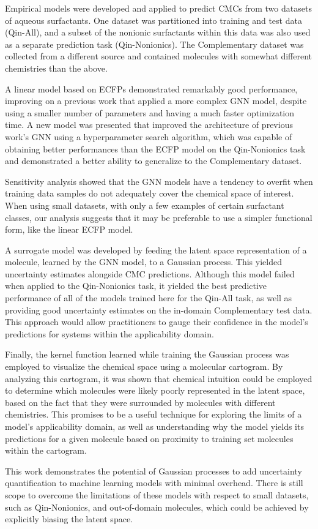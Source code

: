 Empirical models were developed and applied to predict CMCs from two datasets of
aqueous surfactants. One dataset was partitioned into training and test data
(Qin-All), and a subset of the nonionic surfactants within this data was also
used as a separate prediction task (Qin-Nonionics). The Complementary dataset was
collected from a different source and contained molecules with somewhat
different chemistries than the above.

A linear model based on ECFPs demonstrated remarkably good performance,
improving on a previous work \cite{qinPredictingCriticalMicelle2021} that
applied a more complex GNN model, despite using a smaller number of parameters
and having a much faster optimization time. A new model was presented that
improved the architecture of previous work's GNN using a hyperparameter search
algorithm, which was capable of obtaining better performances than the ECFP
model on the Qin-Nonionics task and demonstrated a better ability to generalize
to the Complementary dataset.

Sensitivity analysis showed that the GNN models have a tendency to overfit when
training data samples do not adequately cover the chemical space of interest.
When using small datasets, with only a few examples of certain surfactant
classes, our analysis suggests that it may be preferable to use a simpler
functional form, like the linear ECFP model.

A surrogate model was developed by feeding the latent space representation of a
molecule, learned by the GNN model, to a Gaussian process. This yielded
uncertainty estimates alongside CMC predictions. Although this model failed when
applied to the Qin-Nonionics task, it yielded the best predictive performance of
all of the models trained here for the Qin-All task, as well as providing good
uncertainty estimates on the in-domain Complementary test data. This approach would allow
practitioners to gauge their confidence in the model's predictions for systems
within the applicability domain.

Finally, the kernel function learned while training the Gaussian process was
employed to visualize the chemical space using a molecular cartogram. By
analyzing this cartogram, it was shown that chemical intuition could be employed
to determine which molecules were likely poorly represented in the latent space,
based on the fact that they were surrounded by molecules with different
chemistries. This promises to be a useful technique for exploring the limits of
a model's applicability domain, as well as understanding why the model yields
its predictions for a given molecule based on proximity to training set
molecules within the cartogram.

This work demonstrates the potential of Gaussian processes to add uncertainty
quantification to machine learning models with minimal overhead. There is still
scope to overcome the limitations of these models with respect to small
datasets, such as Qin-Nonionics, and out-of-domain molecules, which could be
achieved by explicitly biasing the latent space.